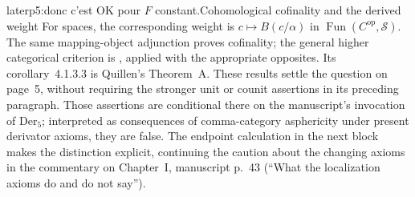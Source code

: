 \begin{dcomment}{later}{p5:donc c'est OK pour $F$ constant.}{Cohomological cofinality and the derived weight}
For spaces, the corresponding weight is $c\mapsto B(c/\alpha)$ in $\operatorname{Fun}(C^{\mathrm{op}},\mathcal S)$. The same mapping-object adjunction proves cofinality; the general higher categorical criterion is \citet[Theorem~4.1.3.1, together with Proposition~4.1.1.8]{Lurie2009HTT}, applied with the appropriate opposites. Its corollary~4.1.3.3 is Quillen's Theorem~A. These results settle the question on page~5, without requiring the stronger unit or counit assertions in its preceding paragraph. Those assertions are conditional there on the manuscript's invocation of $\mathrm{Der}_5$; interpreted as consequences of comma-category asphericity under present derivator axioms, they are false. The endpoint calculation in the next block makes the distinction explicit, continuing the caution about the changing axioms in the commentary on Chapter~I, manuscript p.~43 (``What the localization axioms do and do not say'').
\end{dcomment}

